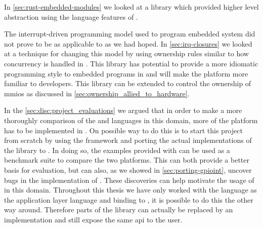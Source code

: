 In \autoref{sec:rust-embedded-modules} we looked at a library which provided higher level abstraction using the language features of {\rust}.

The interrupt-driven programming model used to program embedded system did not prove to be as applicable to {\rust} as we had hoped.
In \autoref{sec:irq-closures} we looked at a technique for changing this model by using ownership rules similar to how concurrency is handled in {\rust}.
This library has potential to provide a more idiomatic programming style to embedded programs in {\rust} and will make the platform more familiar to {\rust} developers.
This library can be extended to control the ownership of \glspl{mmio} as discussed in \autoref{sec:ownership_allied_to_hardware}.

In the \autoref{sec:disc:project_evaluations} we argued that in order to make a more thoroughly comparison of the {\C} and {\rust} languages in this domain, more of the platform has to be implemented in {\rust}.
On possible way to do this is to start this project from scratch by using the  framework and porting the actual implementations of the {\emlib} library to {\rust}.
In doing so, the examples provided with {\emlib} can be used as a benchmark suite to compare the two platforms.
This can both provide a better basis for evaluation, but can also, as we showed in \autoref{sec:porting-gpioint}, uncover bugs in the {\C} implementation of {\emlib}.
These discoveries can help motivate the usage of {\rust} in this domain.
Throughout this thesis we have only worked with the {\rust} language as the application layer language and binding to {\C}, it is possible to do this the other way around.
Therefore parts of the {\emlib} library can actually be replaced by an {\rust} implementation and still expose the same \gls{api} to the user.
